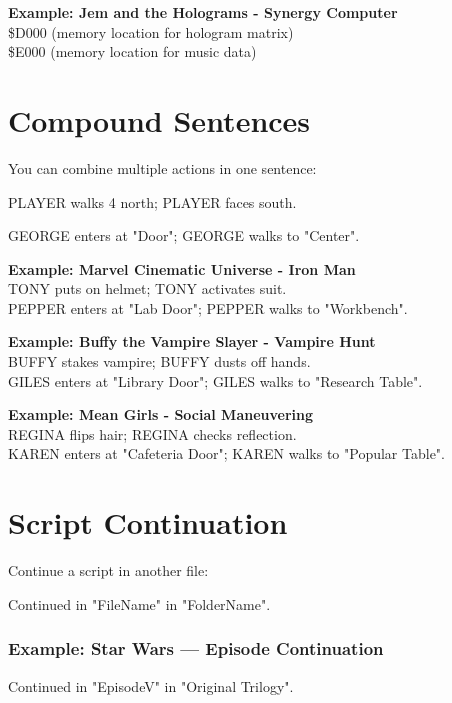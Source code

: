 \documentclass[11pt,letterpaper,oldstylefigures]{memoir}
\newcommand{\stagedir}[1]{#1\par\vspace{1\baselineskip}}
\newenvironment{FountainExample}
  {\begingroup
  \ttfamily\small
   \setlength{\parindent}{0pt}
  \setlength{\parskip}{0.5em}
  \allowdisplaybreaks
  \setlength{\displaywidowpenalty}{0}
  \setlength{\widowpenalty}{0}
  \setlength{\clubpenalty}{0}
  \setlength{\interlinepenalty}{0}
}
  {\endgroup}
\begin{document}
\textbf{Example: Jem and the Holograms - Synergy Computer}\\
\$D000 (memory location for hologram matrix)\\
\$E000 (memory location for music data)

\section{Compound Sentences}

You can combine multiple actions in one sentence:

\begin{FountainExample}
\stagedir{PLAYER walks 4 north; PLAYER faces south.}
GEORGE enters at "Door"; GEORGE walks to "Center".
\end{FountainExample}

\textbf{Example: Marvel Cinematic Universe - Iron Man}\\
TONY puts on helmet; TONY activates suit.\\
PEPPER enters at "Lab Door"; PEPPER walks to "Workbench".

\textbf{Example: Buffy the Vampire Slayer - Vampire Hunt}\\
BUFFY stakes vampire; BUFFY dusts off hands.\\
GILES enters at "Library Door"; GILES walks to "Research Table".

\textbf{Example: Mean Girls - Social Maneuvering}\\
REGINA flips hair; REGINA checks reflection.\\
KAREN enters at "Cafeteria Door"; KAREN walks to "Popular Table".

\section{Script Continuation}

Continue a script in another file:

\begin{FountainExample}
Continued in "FileName" in "FolderName".
\end{FountainExample}

\subsubsection{Example: Star Wars — Episode Continuation}
\begin{FountainExample}
Continued in "EpisodeV" in "Original Trilogy".
\end{FountainExample}
\end{document}
